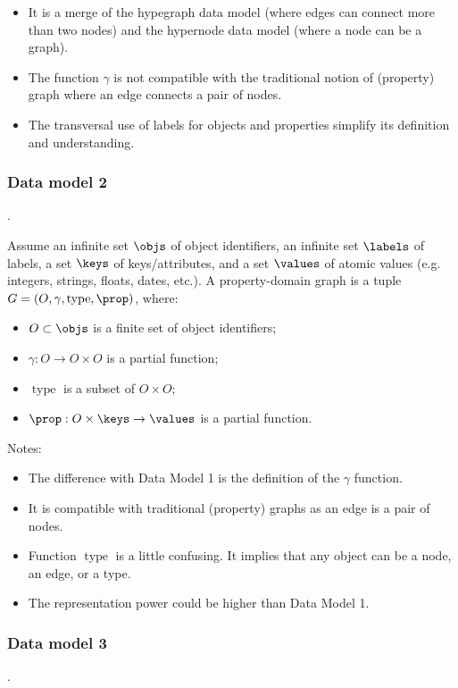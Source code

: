 \begin{itemize}
\item It is a merge of the hypegraph data model (where edges can connect more than two nodes) and the hypernode data model (where a node can be a graph).
\item The function $\gamma$ is not compatible with the traditional notion of  (property) graph where an edge connects a pair of nodes.
\item The transversal use of labels for objects and properties simplify its definition and understanding.
\end{itemize}


\subsubsection{Data model 2}.

\newcommand{\type}{\operatorname{type}}

Assume an infinite set $\objs$ of object identifiers, an infinite set $\labels$ of labels,  a set $\keys$ of keys/attributes, and a set $\values$ of atomic values  (e.g. integers, strings, floats, dates, etc.). 
A property-domain graph is a tuple $G=(O,\gamma,\type,\prop)$, where:
\begin{itemize}
\item $O \subset \objs$ is a finite set of object identifiers;
\item $\gamma : O \to O \times O$ is a partial function; 
\item $\type$ is a subset of $O \times O$; 
\item $\prop : O \times \keys \to \values$ is a partial function.
\end{itemize}

Notes:
\begin{itemize}
\item The difference with Data Model 1 is the definition of the $\gamma$ function.
\item It is compatible with traditional (property) graphs as an edge is a pair of nodes.
\item Function $\type$ is a little confusing. It implies that any object can be a node, an edge, or a type. 
\item The representation power could be higher than Data Model 1.  
\end{itemize}

\subsubsection{Data model 3}.

